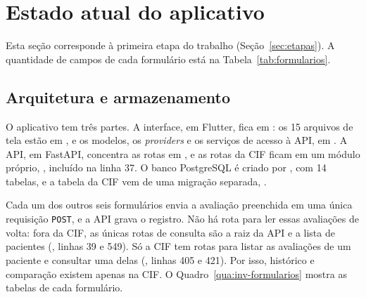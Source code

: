 \section{Estado atual do aplicativo}
\label{sec:inventario}

Esta seção corresponde à primeira etapa do trabalho (Seção~\ref{sec:etapas}). A quantidade de campos de cada
formulário está na Tabela~\ref{tab:formularios}.

\subsection{Arquitetura e armazenamento}
\label{sec:inv-arquitetura}

O aplicativo tem três partes. A interface, em Flutter, fica em : os 15 arquivos de tela estão em
, e os modelos, os \textit{providers} e os serviços de acesso à API, em
. A API, em FastAPI, concentra as rotas em , e as rotas da CIF ficam em um
módulo próprio, , incluído na linha 37. O banco PostgreSQL é criado por
, com 14 tabelas, e a tabela da CIF vem de uma migração separada,
.

Cada um dos outros seis formulários envia a avaliação preenchida em uma única requisição \texttt{POST}, e a API grava
o registro. Não há rota para ler essas avaliações de volta: fora da CIF, as únicas rotas de consulta são a raiz da
API e a lista de pacientes (, linhas 39 e 549). Só a CIF tem rotas para listar as avaliações de
um paciente e consultar uma delas (, linhas 405 e 421). Por isso, histórico e comparação
existem apenas na CIF. O Quadro~\ref{qua:inv-formularios} mostra as tabelas de cada formulário.

